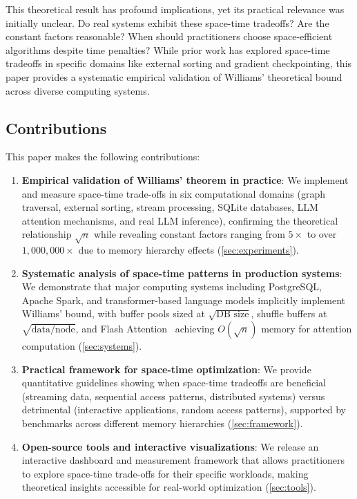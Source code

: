 \documentclass[11pt]{article}
\theoremstyle{definition}
\begin{document}
This theoretical result has profound implications, yet its practical relevance was initially unclear. Do real systems exhibit these space-time tradeoffs? Are the constant factors reasonable? When should practitioners choose space-efficient algorithms despite time penalties? While prior work has explored space-time tradeoffs in specific domains like external sorting and gradient checkpointing, this paper provides a systematic empirical validation of Williams' theoretical bound across diverse computing systems.

\subsection{Contributions}

This paper makes the following contributions:

\begin{enumerate}
\item \textbf{Empirical validation of Williams' theorem in practice}: We implement and measure space-time trade-offs in six computational domains (graph traversal, external sorting, stream processing, SQLite databases, LLM attention mechanisms, and real LLM inference), confirming the theoretical relationship $\sqrt{n}$ while revealing constant factors ranging from $5\times$ to over $1{,}000{,}000\times$ due to memory hierarchy effects (\cref{sec:experiments}).

\item \textbf{Systematic analysis of space-time patterns in production systems}: We demonstrate that major computing systems including PostgreSQL, Apache Spark, and transformer-based language models implicitly implement Williams' bound, with buffer pools sized at $\sqrt{\text{DB size}}$, shuffle buffers at $\sqrt{\text{data/node}}$, and Flash Attention~\cite{flashattention2022} achieving $O(\sqrt{n})$ memory for attention computation (\cref{sec:systems}).

\item \textbf{Practical framework for space-time optimization}: We provide quantitative guidelines showing when space-time tradeoffs are beneficial (streaming data, sequential access patterns, distributed systems) versus detrimental (interactive applications, random access patterns), supported by benchmarks across different memory hierarchies (\cref{sec:framework}).

\item \textbf{Open-source tools and interactive visualizations}: We release an interactive dashboard and measurement framework that allows practitioners to explore space-time trade-offs for their specific workloads, making theoretical insights accessible for real-world optimization (\cref{sec:tools}).
\end{enumerate}
\end{document}
